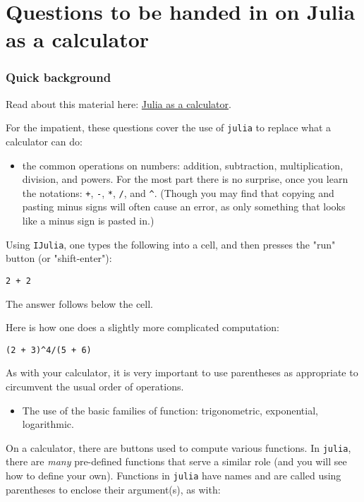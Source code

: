 \documentclass[12pt]{article}
\begin{document}
\section{Questions to be handed in on Julia as a calculator}

\subsubsection{Quick background}

Read about this material here:
\href{http://mth229.github.io/calculator.html}{Julia as a calculator}.

For the impatient, these questions cover the use of \texttt{julia} to
replace what a calculator can do:

\begin{itemize}
\itemsep1pt\parskip0pt
\item
  the common operations on numbers: addition, subtraction,
  multiplication, division, and powers. For the most part there is no
  surprise, once you learn the notations: \texttt{+}, \texttt{-},
  \texttt{*}, \texttt{/}, and \texttt{\^{}}. (Though you may find that
  copying and pasting minus signs will often cause an error, as only
  something that looks like a minus sign is pasted in.)
\end{itemize}

Using \texttt{IJulia}, one types the following into a cell, and then
presses the "run" button (or "shift-enter"):



\begin{verbatim}
2 + 2
\end{verbatim}
The answer follows below the cell.

Here is how one does a slightly more complicated computation:



\begin{verbatim}
(2 + 3)^4/(5 + 6)
\end{verbatim}
As with your calculator, it is very important to use parentheses as
appropriate to circumvent the usual order of operations.

\begin{itemize}
\itemsep1pt\parskip0pt
\item
  The use of the basic families of function: trigonometric, exponential,
  logarithmic.
\end{itemize}

On a calculator, there are buttons used to compute various functions. In
\texttt{julia}, there are \emph{many} pre-defined functions that serve a
similar role (and you will see how to define your own). Functions in
\texttt{julia} have names and are called using parentheses to enclose
their argument(s), as with:
\end{document}
